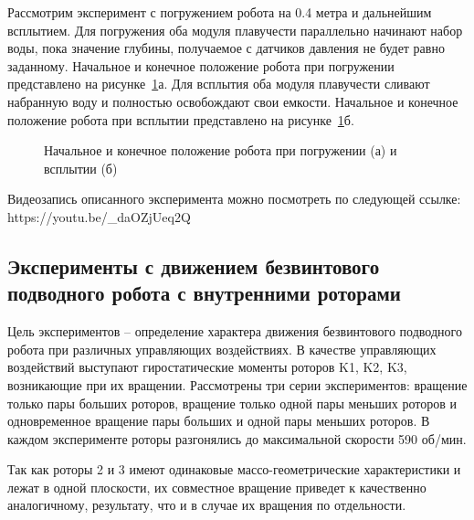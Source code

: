 Рассмотрим эксперимент с погружением робота на 0.4 метра и дальнейшим всплытием. Для погружения оба модуля плавучести параллельно начинают набор воды, пока значение глубины, получаемое с датчиков давления не будет равно заданному. Начальное и конечное положение робота при погружении представлено на рисунке~\ref{BPRUpDown}а. Для всплытия оба модуля плавучести сливают набранную воду и полностью освобождают свои емкости. Начальное и конечное положение робота при всплытии представлено на рисунке~\ref{BPRUpDown}б.

\begin{figure}[!ht]
	\begin{minipage}[h]{0.5\linewidth}
	\end{minipage}
	\hfill
	\begin{minipage}[h]{0.5\linewidth}
	\end{minipage}
	
	\begin{minipage}[h]{0.5\linewidth}
	\end{minipage}
	\hfill
	\begin{minipage}[h]{0.5\linewidth}
	\end{minipage}
	
	\caption{Начальное и конечное положение робота при погружении (а) и всплытии (б)}
	\label{BPRUpDown}
\end{figure}

Видеозапись описанного эксперимента можно посмотреть по следующей ссылке: https://youtu.be/\_daOZjUeq2Q

\subsection{Эксперименты с движением безвинтового подводного робота с внутренними роторами}

Цель экспериментов -- определение характера движения безвинтового подводного робота при различных управляющих воздействиях. В качестве управляющих воздействий выступают гиростатические моменты роторов K1, K2, K3, возникающие при их вращении. Рассмотрены три серии экспериментов: вращение только пары больших роторов, вращение только одной пары меньших роторов и одновременное вращение пары больших и одной пары меньших роторов. В каждом эксперименте роторы разгонялись до максимальной скорости 590 об/мин.

Так как роторы 2 и 3 имеют одинаковые массо-геометрические характеристики и лежат в одной плоскости, их совместное вращение приведет к качественно аналогичному, результату, что и в случае их вращения по отдельности.


